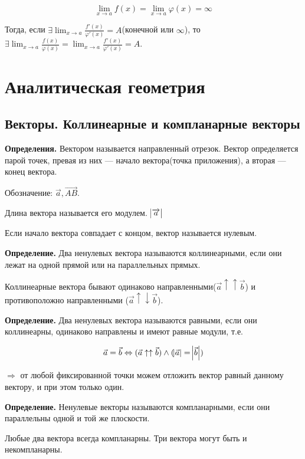 \documentclass{article}
\begin{document}
    \[\lim_{x \to a} f(x) = \lim_{x \to a} \varphi(x) = \infty\]

    Тогда, если \(\exists \lim_{x \to a} \frac{f'(x)}{\varphi'(x)} = A\)(конечной или \(\infty\)), то \(\exists \lim_{x \to a} \frac{f(x)}{\varphi(x)} = \lim_{x \to a} \frac{f'(x)}{\varphi'(x)} = A\).

    \section{Аналитическая геометрия}

    \subsection{Векторы. Коллинеарные и компланарные векторы}

    \textbf{Определения.} Вектором называется направленный отрезок.
    Вектор определяется парой точек, превая из них --- начало вектора(точка приложения), а вторая --- конец вектора.

    Обозначение: \(\overrightarrow{a}, \overrightarrow{AB}\).

    Длина вектора называется его модулем. \(\abs{\overrightarrow{a}}\)

    Если начало вектора совпадает с концом, вектор называется нулевым.

    \textbf{Определение.} Два ненулевых вектора называются коллинеарными, если они лежат на одной прямой или на параллельных прямых.

    Коллинеарные вектора бывают одинаково направленными(\(\overrightarrow{a} \uparrow\uparrow \overrightarrow{b}\)) и противоположно направленными (\(\overrightarrow{a} \uparrow\downarrow \overrightarrow{b}\)).

    \textbf{Определение.} Два ненулевых вектора называются равными, если они коллинеарны, одинаково направлены и имеют равные модули, т.е.

    \[\vec{a} = \vec{b} \Leftrightarrow (\vec{a} \uparrow\uparrow \vec{b})\wedge(\abs{\vec{a}} = \abs{\vec{b}})\]
    
    \(\Rightarrow\) от любой фиксированной точки можем отложить вектор равный данному вектору, и при этом только один.

    \textbf{Определение.} Ненулевые векторы называются компланарными, если они параллельны одной и той же плоскости.
    
    Любые два вектора всегда компланарны. Три вектора могут быть и некомпланарны.
\end{document}
